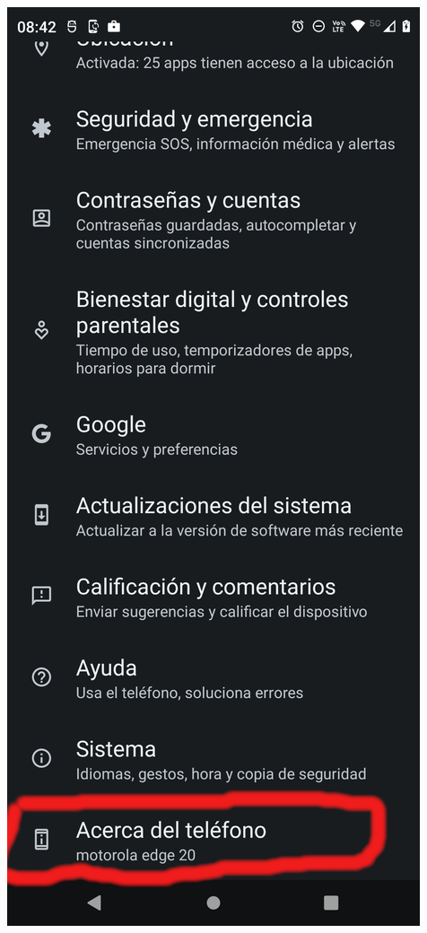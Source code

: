 \begin{frame}
\begin{columns}
\begin{center}
\end{center}
\begin{center}
\includegraphics[width=0.95\linewidth]{00_Configurar/ModoDesarrollador3.png}    

\end{center}
\end{columns}
\end{frame}
